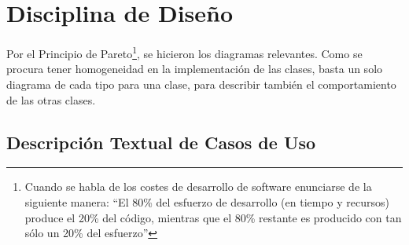 
\chapter{Disciplina de Diseño}
	\label{chap:disenio}
	Por el Principio de Pareto\footnote{Cuando se habla de los costes de desarrollo de software enunciarse de la siguiente manera: ``El 80\% del esfuerzo de desarrollo (en tiempo y recursos) produce el 20\% del código, mientras que el 80\% restante es producido con tan sólo un 20\% del esfuerzo''}, se hicieron los diagramas relevantes. Como se procura tener homogeneidad en la implementación de las clases, basta un solo diagrama de cada tipo para una clase, para describir también el comportamiento de las otras clases.

	\section{Descripción Textual de Casos de Uso}
